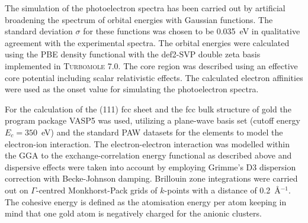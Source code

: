 The simulation of the photoelectron spectra has been carried out by artificial
broadening the spectrum of orbital energies with Gaussian functions. The
standard deviation $\sigma$ for these functions was chosen to be 0.035~eV in
qualitative agreement with the experimental spectra. The orbital energies were
calculated using the PBE density functional with the
def2-SVP\autocite{Weigend_Balancedbasissets_2005} double zeta basis implemented
in \textsc{Turbomole} 7.0.\autocite{_TURBOMOLEV72015_} The core region was
described using an effective core potential including scalar relativistic
effects.  The calculated electron affinities were used as the onset value for
simulating the photoelectron spectra. 


For the calculation of the (111) fcc sheet and the fcc bulk structure of gold
the program package VASP5\autocite{Kresse_Efficiencyabinitiototal_1996} was
used, utilizing a plane-wave basis set (cutoff energy $E_c=350$~eV) and the
standard \ac{PAW} datasets for the elements to model the electron-ion
interaction\autocite{Blochl_Projectoraugmentedwavemethod_1994,Kresse_ultrasoftpseudopotentialsprojector_1999}.
The electron-electron interaction was modelled within the \ac{GGA} to the
exchange-correlation energy functional as described above and dispersive effects
were taken into account by employing Grimme's D3 dispersion correction with
Becke-Johnson
damping.\autocite{Grimme_consistentaccurateinitio_2010,Grimme_Effectdampingfunction_2011}
Brillouin zone integrations were carried out on $\Gamma$-centred Monkhorst-Pack
grids of $k$-points with a distance of 0.2~\AA$^{-1}$. The cohesive energy is
defined as the atomisation energy per atom keeping in mind that one gold atom is
negatively charged for the anionic clusters.

